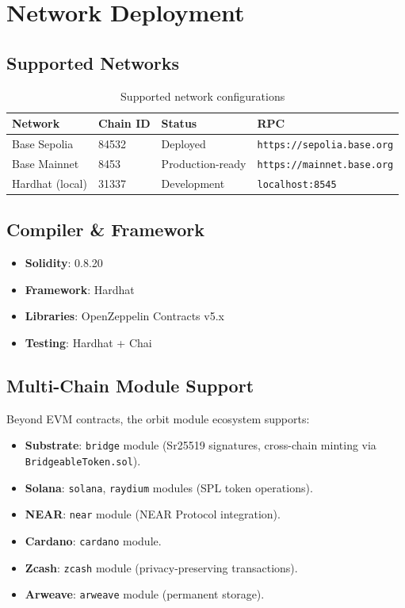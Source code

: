 \documentclass[11pt,a4paper]{article}
\begin{document}
\section{Network Deployment}
\label{sec:deployment}

\subsection{Supported Networks}

\begin{table}[H]
\centering
\begin{tabular}{llll}
\toprule
\textbf{Network} & \textbf{Chain ID} & \textbf{Status} & \textbf{RPC} \\
\midrule
Base Sepolia & 84532 & Deployed & \texttt{https://sepolia.base.org} \\
Base Mainnet & 8453 & Production-ready & \texttt{https://mainnet.base.org} \\
Hardhat (local) & 31337 & Development & \texttt{localhost:8545} \\
\bottomrule
\end{tabular}
\caption{Supported network configurations}
\end{table}

\subsection{Compiler \& Framework}

\begin{itemize}
    \item \textbf{Solidity}: 0.8.20
    \item \textbf{Framework}: Hardhat
    \item \textbf{Libraries}: OpenZeppelin Contracts v5.x
    \item \textbf{Testing}: Hardhat + Chai
\end{itemize}

\subsection{Multi-Chain Module Support}

Beyond EVM contracts, the orbit module ecosystem supports:
\begin{itemize}
    \item \textbf{Substrate}: \texttt{bridge} module (Sr25519 signatures, cross-chain minting via \texttt{BridgeableToken.sol}).
    \item \textbf{Solana}: \texttt{solana}, \texttt{raydium} modules (SPL token operations).
    \item \textbf{NEAR}: \texttt{near} module (NEAR Protocol integration).
    \item \textbf{Cardano}: \texttt{cardano} module.
    \item \textbf{Zcash}: \texttt{zcash} module (privacy-preserving transactions).
    \item \textbf{Arweave}: \texttt{arweave} module (permanent storage).
\end{itemize}
\end{document}
